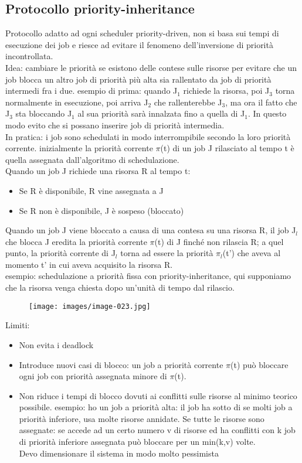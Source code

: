 \documentclass[12pt, oneside]{extbook}
\begin{document}
\subsection{Protocollo priority-inheritance}
Protocollo adatto ad ogni scheduler priority-driven, non si basa sui tempi di esecuzione dei job e riesce ad evitare il fenomeno dell'inversione di priorità incontrollata.\\ Idea: cambiare le priorità se esistono delle contese sulle risorse per evitare che un job blocca un altro job di priorità più alta sia rallentato da job di priorità intermedi fra i due. esempio di prima: quando J$_{1}$ richiede la risorsa, poi J$_{3}$ torna normalmente in esecuzione, poi arriva J$_{2}$ che rallenterebbe J$_{3}$, ma ora il fatto che J$_{3}$ sta bloccando J$_{1}$ al sua priorità sarà innalzata fino a quella di J$_{1}$. In questo modo evito che si possano inserire job di priorità intermedia.\\ In pratica: i job sono schedulati in modo interrompibile secondo la loro priorità corrente. inizialmente la priorità corrente $\pi$(t) di un job J rilasciato al tempo t è quella assegnata dall'algoritmo di schedulazione.\\ Quando un job J richiede una risorsa R al tempo t:
\begin{itemize}
\item Se R è disponibile, R vine assegnata a J
\item Se R non è disponibile, J è sospeso (bloccato)
\end{itemize}
Quando un job J viene bloccato a causa di una contesa su una risorsa R, il job J$_{l}$ che blocca J eredita la priorità corrente $\pi$(t)  di J finché non rilascia R; a quel punto, la priorità corrente di J$_{l}$ torna ad essere la priorità $\pi_{l}$(t') che aveva al momento t' in cui aveva acquisito la risorsa R.\\ esempio: schedulazione a priorità fissa con priority-inheritance, qui supponiamo che la risorsa venga chiesta dopo un'unità di tempo dal rilascio.\\
\begin{figure}[!h]
\centering
\texttt{[image: images/image-023.jpg]}
\end{figure}
Limiti:
\begin{itemize}
\item Non evita i deadlock
\item Introduce nuovi casi di blocco: un job a priorità corrente $\pi$(t) può bloccare ogni job con priorità assegnata minore di $\pi$(t).
\item Non riduce i tempi di blocco dovuti ai conflitti sulle risorse al minimo teorico possibile. esempio: ho un job a priorità alta: il job ha sotto di se molti job a priorità inferiore, usa molte risorse annidate. Se tutte le risorse sono assegnate: se accede ad un certo numero v di risorse ed ha conflitti con k job di priorità inferiore assegnata può bloccare per un min(k,v) volte.\\ Devo dimensionare il sistema in modo molto pessimista
\end{itemize}
\end{document}
